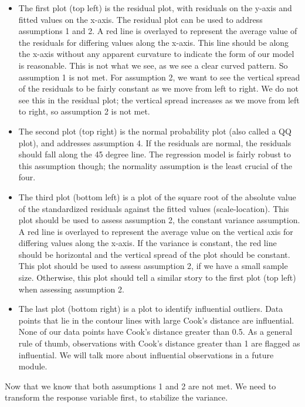 \documentclass[
]{book}
\begin{document}
\begin{itemize}
\item
  The first plot (top left) is the residual plot, with residuals on the y-axis and fitted values on the x-axis. The residual plot can be used to address assumptions 1 and 2. A red line is overlayed to represent the average value of the residuals for differing values along the x-axis. This line should be along the x-axis without any apparent curvature to indicate the form of our model is reasonable. This is not what we see, as we see a clear curved pattern. So assumption 1 is not met. For assumption 2, we want to see the vertical spread of the residuals to be fairly constant as we move from left to right. We do not see this in the residual plot; the vertical spread increases as we move from left to right, so assumption 2 is not met.
\item
  The second plot (top right) is the normal probability plot (also called a QQ plot), and addresses assumption 4. If the residuals are normal, the residuals should fall along the 45 degree line. The regression model is fairly robust to this assumption though; the normality assumption is the least crucial of the four.
\item
  The third plot (bottom left) is a plot of the square root of the absolute value of the standardized residuals against the fitted values (scale-location). This plot should be used to assess assumption 2, the constant variance assumption. A red line is overlayed to represent the average value on the vertical axis for differing values along the x-axis. If the variance is constant, the red line should be horizontal and the vertical spread of the plot should be constant. This plot should be used to assess assumption 2, if we have a small sample size. Otherwise, this plot should tell a similar story to the first plot (top left) when assessing assumption 2.
\item
  The last plot (bottom right) is a plot to identify influential outliers. Data points that lie in the contour lines with large Cook's distance are influential. None of our data points have Cook's distance greater than 0.5. As a general rule of thumb, observations with Cook's distance greater than 1 are flagged as influential. We will talk more about influential observations in a future module.
\end{itemize}

Now that we know that both assumptions 1 and 2 are not met. We need to transform the response variable first, to stabilize the variance.
\end{document}
